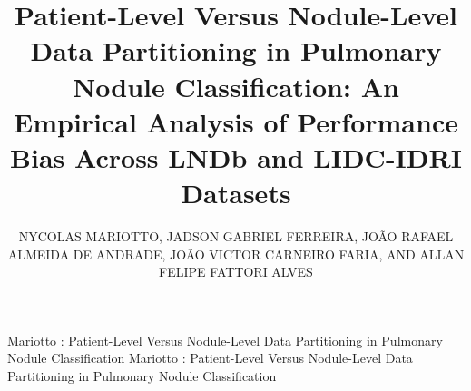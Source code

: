 \documentclass{ieeeaccess}
\begin{document}

\title{Patient-Level Versus Nodule-Level Data Partitioning in Pulmonary Nodule Classification: An Empirical Analysis of Performance Bias Across LNDb and LIDC-IDRI Datasets}

\author{\uppercase{Nycolas Mariotto},
\uppercase{Jadson Gabriel Ferreira},
\uppercase{Jo\~ao Rafael Almeida de Andrade},
\uppercase{Jo\~ao Victor Carneiro Faria},
AND \uppercase{Allan Felipe Fattori Alves}}
\address[1]{Institute of Biosciences, S\~ao Paulo State University (UNESP), Botucatu, S\~ao Paulo 18618-689, Brazil}


\markboth
{Mariotto \headeretal: Patient-Level Versus Nodule-Level Data Partitioning in Pulmonary Nodule Classification}
{Mariotto \headeretal: Patient-Level Versus Nodule-Level Data Partitioning in Pulmonary Nodule Classification}

\end{document}
